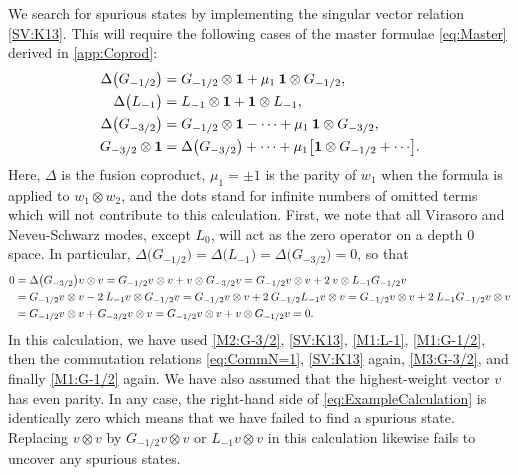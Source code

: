 \documentclass[a4paper,reqno,12pt]{report}
\theoremstyle{definition}
\numberwithin{equation}{section}
\let\originalleft\left     %
\let\originalright\right
\renewcommand{\left}{\mathopen{}\mathclose\bgroup\originalleft}
\renewcommand{\right}{\aftergroup\egroup\originalright}
\newcommand{\sqbrac}[1]{\left[ #1 \right]}
\newcommand{\wun}{\mathbf{1}}  %
\newcommand{\coproductsymb}{\Delta}                                                %
\newcommand{\coproduct}[1]{\coproductsymb \bigl( #1 \bigr)}                        %
\newcommand{\hw}{highest-weight}
\newcommand{\hws}{\hw{} vector}
\newcommand{\sv}{singular vector}
\newcommand{\rhs}{right-hand side}
\newcommand{\ns}{Neveu-Schwarz}
\theoremstyle{plain}
\begin{document}
We search for spurious states by implementing the \sv{} relation \eqref{SV:K13}.  This will require the following cases of the master formulae \eqref{eq:Master} derived in \cref{app:Coprod}:
\begin{subequations}
\begin{align}
\coproduct{G_{-1/2}} &= G_{-1/2} \otimes \wun + \mu_1 \: \wun \otimes G_{-1/2}, \label{M1:G-1/2} \\
\coproduct{L_{-1}} &= L_{-1} \otimes \wun + \wun \otimes L_{-1}, \label{M1:L-1} \\
\coproduct{G_{-3/2}} &= G_{-1/2} \otimes \wun - \cdots + \mu_1 \: \wun \otimes G_{-3/2}, \label{M2:G-3/2} \\
G_{-3/2} \otimes \wun &= \coproduct{G_{-3/2}} + \cdots + \mu_1 \sqbrac{\wun \otimes G_{-1/2} + \cdots}. \label{M3:G-3/2}
\end{align}
\end{subequations}
Here, $\coproductsymb$ is the fusion coproduct, $\mu_1 = \pm 1$ is the parity of $w_1$ when the formula is applied to $w_1 \otimes w_2$, and the dots stand for infinite numbers of omitted terms which will not contribute to this calculation.  First, we note that all Virasoro and \ns{} modes, except $L_0$, will act as the zero operator on a depth $0$ space.  In particular, $\coproduct{G_{-1/2}} = \coproduct{L_{-1}} = \coproduct{G_{-3/2}} = 0$, so that
\begin{align} \label{eq:ExampleCalculation}
0 &= \coproduct{G_{-3/2}} v \otimes v = G_{-1/2} v \otimes v + v \otimes G_{-3/2} v = G_{-1/2} v \otimes v + 2 \: v \otimes L_{-1} G_{-1/2} v \notag \\
&= G_{-1/2} v \otimes v - 2 \: L_{-1} v \otimes G_{-1/2} v = G_{-1/2} v \otimes v + 2 \: G_{-1/2} L_{-1} v \otimes v = G_{-1/2} v \otimes v + 2 \: L_{-1} G_{-1/2} v \otimes v \notag \\
&= G_{-1/2} v \otimes v + G_{-3/2} v \otimes v = G_{-1/2} v \otimes v + v \otimes G_{-1/2} v = 0.
\end{align}
In this calculation, we have used \eqref{M2:G-3/2}, \eqref{SV:K13}, \eqref{M1:L-1}, \eqref{M1:G-1/2}, then the commutation relations \eqref{eq:CommN=1}, \eqref{SV:K13} again, \eqref{M3:G-3/2}, and finally \eqref{M1:G-1/2} again.  We have also assumed that the \hws{} $v$ has even parity.  In any case, the \rhs{} of \eqref{eq:ExampleCalculation} is identically zero which means that we have failed to find a spurious state.  Replacing $v \otimes v$ by $G_{-1/2} v \otimes v$ or $L_{-1} v \otimes v$ in this calculation likewise fails to uncover any spurious states.
\end{document}
